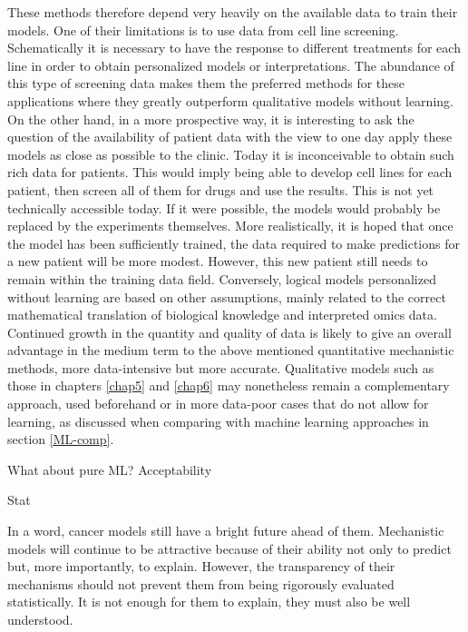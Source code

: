 \documentclass[a4paper,12pt,twoside,onecolumn,openright,final,oldfontcommands]{memoir}
\begin{document}
These methods therefore depend very heavily on the available data to
train their models. One of their limitations is to use data from cell
line screening. Schematically it is necessary to have the response to
different treatments for each line in order to obtain personalized
models or interpretations. The abundance of this type of screening data
makes them the preferred methods for these applications where they
greatly outperform qualitative models without learning. On the other
hand, in a more prospective way, it is interesting to ask the question
of the availability of patient data with the view to one day apply these
models as close as possible to the clinic. Today it is inconceivable to
obtain such rich data for patients. This would imply being able to
develop cell lines for each patient, then screen all of them for drugs
and use the results. This is not yet technically accessible today. If it
were possible, the models would probably be replaced by the experiments
themselves. More realistically, it is hoped that once the model has been
sufficiently trained, the data required to make predictions for a new
patient will be more modest. However, this new patient still needs to
remain within the training data field. Conversely, logical models
personalized without learning are based on other assumptions, mainly
related to the correct mathematical translation of biological knowledge
and interpreted omics data. Continued growth in the quantity and quality
of data is likely to give an overall advantage in the medium term to the
above mentioned quantitative mechanistic methods, more data-intensive
but more accurate. Qualitative models such as those in chapters
\ref{chap5} and \ref{chap6} may nonetheless remain a complementary
approach, used beforehand or in more data-poor cases that do not allow
for learning, as discussed when comparing with machine learning
approaches in section \ref{ML-comp}.

What about pure ML? Acceptability

Stat

In a word, cancer models still have a bright future ahead of them.
Mechanistic models will continue to be attractive because of their
ability not only to predict but, more importantly, to explain. However,
the transparency of their mechanisms should not prevent them from being
rigorously evaluated statistically. It is not enough for them to
explain, they must also be well understood.

\appendix {}
\end{document}
